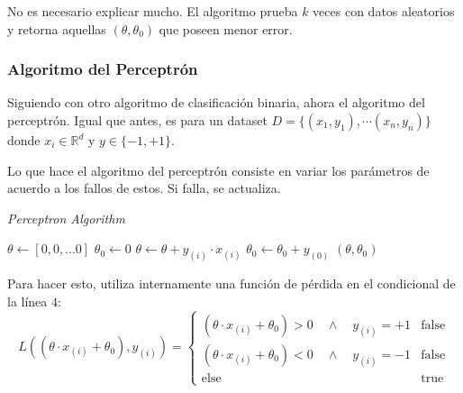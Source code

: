 No es necesario explicar mucho. 
El algoritmo prueba $k$ veces con datos aleatorios y retorna aquellas $(\theta, \theta_{0})$ que poseen menor error.

\subsubsection{Algoritmo del Perceptrón}

Siguiendo con otro algoritmo de clasificación binaria, ahora el algoritmo del perceptrón. 
Igual que antes, es para un dataset $D = \{(x_1, y_1), \cdots (x_n, y_n)\}$ donde $x_i \in \mathbb{R}^d$ y $y \in \{-1, +1\}$.

Lo que hace el algoritmo del perceptrón consiste en variar los parámetros de acuerdo a los fallos de estos.
Si falla, se actualiza.

\begin{algorithm}
    \caption{\textit{Perceptron Algorithm}}
    \begin{algorithmic}[1]
            \State$\theta \gets [0, 0, \dots 0]$ 
            \State$\theta_0 \gets 0$ 
                        \State$\theta \gets \theta + y_{(i)} \cdot x_{(i)}$
                        \State$\theta_0 \gets \theta_0 + y_{(0)}$
                    \EndIf{}
                \EndFor{}
            \EndFor{}
            \State\Return$(\theta, \theta_{0})$ 
    \EndProcedure$ $
    \end{algorithmic}
\end{algorithm}

Para hacer esto, utiliza internamente una función de pérdida en el condicional de la línea $4$:
\[
    L((\theta \cdot x_{(i)} + \theta_0), y_{(i)}) = \begin{cases}
        (\theta \cdot x_{(i)} + \theta_0) > 0 \quad \land \quad y_{(i)} = +1   &   \text{false}\\
        (\theta \cdot x_{(i)} + \theta_0) < 0 \quad \land \quad y_{(i)} = -1   &   \text{false}\\
        \text{else} &   \text{true}
    \end{cases}
\]
